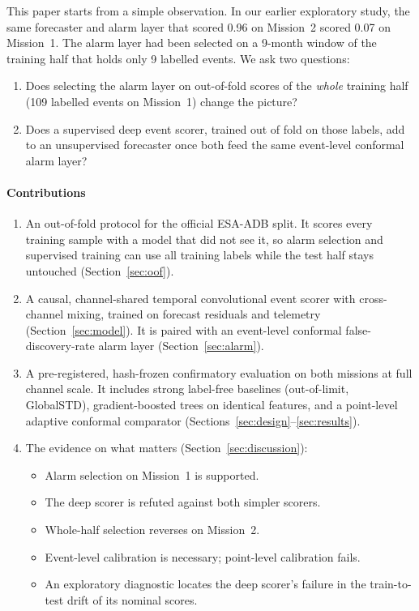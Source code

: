\documentclass[preprint,12pt,authoryear]{elsarticle}
\begin{document}
This paper starts from a simple observation. In our earlier exploratory study, the same
forecaster and alarm layer that scored 0.96 on Mission~2 scored 0.07 on Mission~1. The
alarm layer had been selected on a 9-month window of the training half that holds only 9
labelled events. We ask two questions:
\begin{enumerate}
\item Does selecting the alarm layer on out-of-fold scores of the \emph{whole} training half
  (109 labelled events on Mission~1) change the picture?
\item Does a supervised deep event scorer, trained out of fold on those labels, add to an
  unsupervised forecaster once both feed the same event-level conformal alarm layer?
\end{enumerate}

\paragraph{Contributions}
\begin{enumerate}
\item An out-of-fold protocol for the official ESA-ADB split. It scores every training sample
  with a model that did not see it, so alarm selection and supervised training can use all
  training labels while the test half stays untouched (Section~\ref{sec:oof}).
\item A causal, channel-shared temporal convolutional event scorer with cross-channel mixing,
  trained on forecast residuals and telemetry (Section~\ref{sec:model}). It is paired with an
  event-level conformal false-discovery-rate alarm layer (Section~\ref{sec:alarm}).
\item A pre-registered, hash-frozen confirmatory evaluation on both missions at full channel
  scale. It includes strong label-free baselines (out-of-limit, GlobalSTD), gradient-boosted
  trees on identical features, and a point-level adaptive conformal comparator
  (Sections~\ref{sec:design}--\ref{sec:results}).
\item The evidence on what matters (Section~\ref{sec:discussion}):
  \begin{itemize}
  \item Alarm selection on Mission~1 is supported.
  \item The deep scorer is refuted against both simpler scorers.
  \item Whole-half selection reverses on Mission~2.
  \item Event-level calibration is necessary; point-level calibration fails.
  \item An exploratory diagnostic locates the deep scorer's failure in the
    train-to-test drift of its nominal scores.
  \end{itemize}
\end{enumerate}
\end{document}
